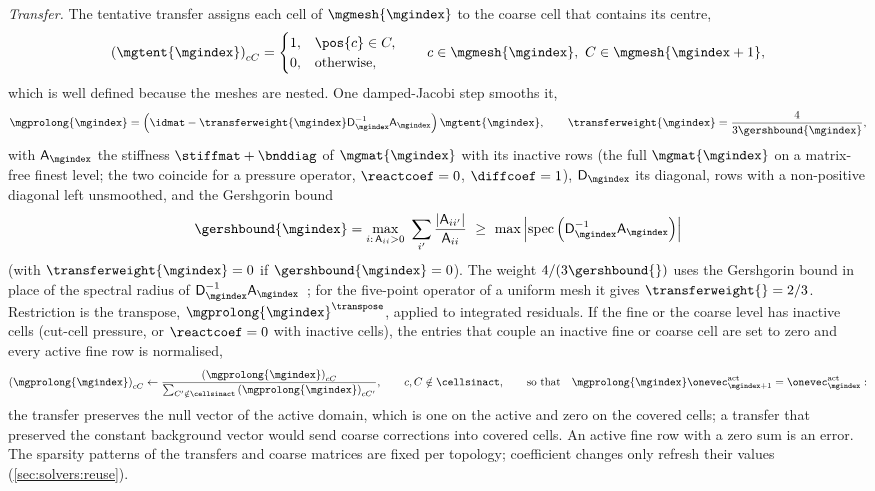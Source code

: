\emph{Transfer.} The tentative transfer assigns each cell of
$\mgmesh{\mgindex}$ to the coarse cell that contains its centre,
\begin{equation}\label{eq:solvers:tentative}
  \roundpar{\mgtent{\mgindex}}_{cC}=\begin{cases}1, & \pos{c}\in C,\\ 0, & \text{otherwise},\end{cases}
  \qquad c\in\mgmesh{\mgindex},\ C\in\mgmesh{\mgindex+1},
\end{equation}
which is well defined because the meshes are nested. One damped-Jacobi step
smooths it,
\begin{equation}\label{eq:solvers:smoothed-transfer}
  \mgprolong{\mgindex}=\roundpar{\idmat-\transferweight{\mgindex}\mathsf{D}_{\mgindex}^{-1}\mathsf{A}_{\mgindex}}\mgtent{\mgindex},
  \qquad
  \transferweight{\mgindex}=\frac{4}{3\gershbound{\mgindex}},
\end{equation}
with $\mathsf{A}_{\mgindex}$ the stiffness $\stiffmat+\bnddiag$ of
$\mgmat{\mgindex}$ with its inactive rows (the full $\mgmat{\mgindex}$ on a
matrix-free finest level; the two coincide for a pressure operator,
$\reactcoef=0$, $\diffcoef=1$), $\mathsf{D}_{\mgindex}$ its diagonal, rows with
a non-positive diagonal left unsmoothed, and the Gershgorin bound
\begin{equation}\label{eq:solvers:gershgorin}
  \gershbound{\mgindex}=\max_{i:\,\mathsf{A}_{ii}>0}\ \sum_{i'}\frac{\abs{\mathsf{A}_{ii'}}}{\mathsf{A}_{ii}}
  \ \ge\ \max\abs{\operatorname{spec}\roundpar{\mathsf{D}_{\mgindex}^{-1}\mathsf{A}_{\mgindex}}}
\end{equation}
(with $\transferweight{\mgindex}=0$ if $\gershbound{\mgindex}=0$). The weight
$4/(3\gershbound{})$ uses the Gershgorin bound in place of the spectral radius
of $\mathsf{D}_{\mgindex}^{-1}\mathsf{A}_{\mgindex}$~\cite[Thm.~4.6]{saad2003};
for the five-point operator of a uniform mesh it gives $\transferweight{}=2/3$.
Restriction is the transpose, ${\mgprolong{\mgindex}}^{\transpose}$, applied to
integrated residuals. If the fine or the coarse level has inactive cells
(cut-cell pressure, or $\reactcoef=0$ with inactive cells), the entries that
couple an inactive fine or coarse cell are set to zero and every active fine
row is normalised,
\begin{equation}\label{eq:solvers:active-transfer}
  \roundpar{\mgprolong{\mgindex}}_{cC}\leftarrow\frac{\roundpar{\mgprolong{\mgindex}}_{cC}}{\sum_{C'\notin\cellsinact}\roundpar{\mgprolong{\mgindex}}_{cC'}},
  \qquad c,C\notin\cellsinact,
  \qquad\text{so that}\quad\mgprolong{\mgindex}\onevec^{\mathrm{act}}_{\mgindex+1}=\onevec^{\mathrm{act}}_{\mgindex}:
\end{equation}
the transfer preserves the null vector of the active domain, which is one on
the active and zero on the covered cells; a transfer that preserved the
constant background vector would send coarse corrections into covered cells.
An active fine row with a zero sum is an error. The sparsity patterns of the
transfers and coarse matrices are fixed per topology; coefficient changes only
refresh their values (\cref{sec:solvers:reuse}).

